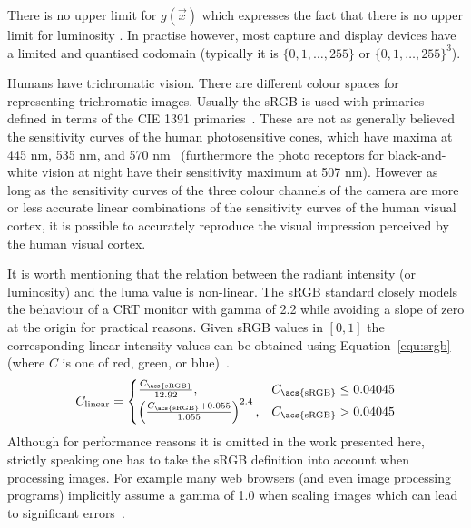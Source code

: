 \documentclass[12pt,a4paper,oneside,openright]{book}
\newcommand{\Eg}{For example }
\newcommand{\equ}[1]{Equation~\ref{equ:#1}}
\begin{document}
\begin{CJK}{UTF8}{}
There is no upper limit for $g(\vec{x})$ which expresses the fact that there is no upper limit for luminosity \citetext{see \citealp{RefWorks:422} for a detailed introduction to high dynamic range imaging}. In practise however, most capture and display devices have a limited and quantised codomain (typically it is $\{0,1,\ldots,255\}$ or $\{0,1,\ldots,255\}^3$).

Humans have trichromatic vision. There are different colour spaces for representing trichromatic images. Usually the \ac{sRGB} is used with primaries defined in terms of the \acs{CIE} 1391 primaries~\citep{cie}. These are not as generally believed the sensitivity curves of the human photosensitive cones, which have maxima at 445 nm, 535 nm, and 570 nm~\citep{RefWorks:440} (furthermore the photo receptors for black-and-white vision at night have their sensitivity maximum at 507 nm). However as long as the sensitivity curves of the three colour channels of the camera are more or less accurate linear combinations of the sensitivity curves of the human visual cortex, it is possible to accurately reproduce the visual impression perceived by the human visual cortex.

It is worth mentioning that the relation between the radiant intensity (or luminosity) and the luma value is non-linear. The \acs{sRGB} standard closely models the behaviour of a \ac{CRT} monitor with gamma of 2.2 while avoiding a slope of zero at the origin for practical reasons. Given \ac{sRGB} values in $[0,1]$ the corresponding linear intensity values can be obtained using \equ{srgb} (where $C$ is one of \acs{red}, \acs{green}, or \acs{blue})~\citep{srgb}.
\begin{equation}\label{equ:srgb}
  C_\mathrm{linear}=
  \begin{cases}\frac{C_\mathrm{\acs{sRGB}}}{12.92}, & C_\mathrm{\acs{sRGB}}\le0.04045\\
  \left(\frac{C_\mathrm{\acs{sRGB}}+0.055}{1.055}\right)^{2.4}, & C_\mathrm{\acs{sRGB}}>0.04045
  \end{cases}
\end{equation}
Although for performance reasons it is omitted in the work presented here, strictly speaking one has to take the \acs{sRGB} definition into account when processing images. \Eg many web browsers (and even image processing programs) implicitly assume a gamma of 1.0 when scaling images which can lead to significant errors~\citep{gamma}.


\end{CJK}
\end{document}
